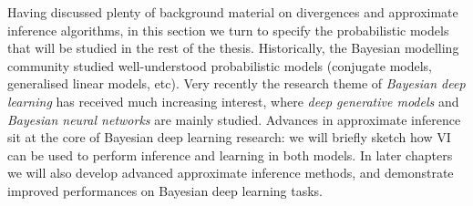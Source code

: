 Having discussed plenty of background material on divergences and approximate inference algorithms, in this section we turn to specify the probabilistic models that will be studied in the rest of the thesis. Historically, the Bayesian modelling community studied well-understood probabilistic models (conjugate models, generalised linear models, etc). Very recently the research theme of \emph{Bayesian deep learning} has received much increasing interest, where \emph{deep generative models} and \emph{Bayesian neural networks} are mainly studied. Advances in approximate inference sit at the core of Bayesian deep learning research: we will briefly sketch how VI can be used to perform inference and learning in both models. In later chapters we will also develop advanced approximate inference methods, and demonstrate improved performances on Bayesian deep learning tasks.

